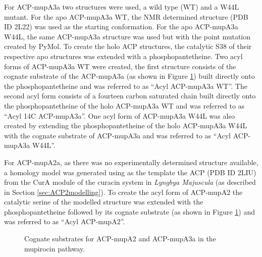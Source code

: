	For ACP-mupA3a two structures were used, a wild type (WT) and a W44L mutant. For the apo ACP-mupA3a WT, the NMR determined structure (PDB ID 2L22) was used as the starting conformation. For the apo ACP-mupA3a W44L, the same ACP-mupA3a structure was used but with the point mutation created by PyMol. To create the holo ACP structures, the catalytic S38 of their respective apo structures was extended with a phosphopantetheine. Two acyl forms of ACP-mupA3a WT were created, the first structure consists of the cognate substrate of the ACP-mupA3a (as shown in Figure \ref{fig:cognateSubstrates}) built directly onto the phosphopantetheine and was referred to as \textquotedblleft Acyl ACP-mupA3a WT\textquotedblright. The second acyl form consists of a fourteen carbon saturated chain built directly onto the phosphopantetheine of the holo ACP-mupA3a WT and was referred to as \textquotedblleft Acyl 14C ACP-mupA3a\textquotedblright. One acyl form of ACP-mupA3a W44L was also created by extending the phosphopantetheine of the holo ACP-mupA3a W44L with the cognate substrate of ACP-mupA3a and was referred to as \textquotedblleft Acyl ACP-mupA3a W44L\textquotedblright.
	 
	For ACP-mupA2a, as there was no experimentally determined structure available, a homology model was generated using as the template the ACP (PDB ID 2LIU) from the CurA module of the curacin system in \textit{Lyngbya Majuscula} (as described in Section \ref{sec:ACP2modelling}). To create the acyl form of ACP-mupA2 the catalytic serine of the modelled structure was extended with the phosphopantetheine followed by its cognate substrate (as shown in Figure \ref{fig:cognateSubstrates}) and was referred to as \textquotedblleft Acyl ACP-mupA2\textquotedblright. 

		\setlength\fboxsep{5pt}
		\setlength\fboxrule{1.5pt}
		\begin{figure}[htbp]
		\centering
		\caption[Cognate substrates for ACP-mupA2 and ACP-mupA3a in the mupirocin pathway.]{Cognate substrates for ACP-mupA2 and ACP-mupA3a in the mupirocin pathway.}
		\label{fig:cognateSubstrates}
		\end{figure}		
	
